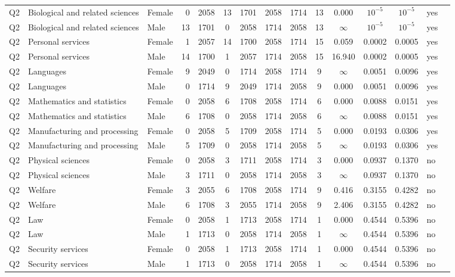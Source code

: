 \begin{longtable}{lllrcccccccccll}
Q2 & Biological and related sciences & Female & 0 & 2058 & 13 & 1701 & 2058 & 1714 & 13 & 0.000 & $10^{-5}$ & $10^{-5}$ & yes \\
Q2 & Biological and related sciences & Male & 13 & 1701 & 0 & 2058 & 1714 & 2058 & 13 & $\infty$ & $10^{-5}$ & $10^{-5}$ & yes \\
Q2 & Personal services & Female & 1 & 2057 & 14 & 1700 & 2058 & 1714 & 15 & 0.059 & 0.0002 & 0.0005 & yes \\
Q2 & Personal services & Male & 14 & 1700 & 1 & 2057 & 1714 & 2058 & 15 & 16.940 & 0.0002 & 0.0005 & yes \\
Q2 & Languages & Female & 9 & 2049 & 0 & 1714 & 2058 & 1714 & 9 & $\infty$ & 0.0051 & 0.0096 & yes \\
Q2 & Languages & Male & 0 & 1714 & 9 & 2049 & 1714 & 2058 & 9 & 0.000 & 0.0051 & 0.0096 & yes \\
Q2 & Mathematics and statistics & Female & 0 & 2058 & 6 & 1708 & 2058 & 1714 & 6 & 0.000 & 0.0088 & 0.0151 & yes \\
Q2 & Mathematics and statistics & Male & 6 & 1708 & 0 & 2058 & 1714 & 2058 & 6 & $\infty$ & 0.0088 & 0.0151 & yes \\
Q2 & Manufacturing and processing & Female & 0 & 2058 & 5 & 1709 & 2058 & 1714 & 5 & 0.000 & 0.0193 & 0.0306 & yes \\
Q2 & Manufacturing and processing & Male & 5 & 1709 & 0 & 2058 & 1714 & 2058 & 5 & $\infty$ & 0.0193 & 0.0306 & yes \\
Q2 & Physical sciences & Female & 0 & 2058 & 3 & 1711 & 2058 & 1714 & 3 & 0.000 & 0.0937 & 0.1370 & no \\
Q2 & Physical sciences & Male & 3 & 1711 & 0 & 2058 & 1714 & 2058 & 3 & $\infty$ & 0.0937 & 0.1370 & no \\
Q2 & Welfare & Female & 3 & 2055 & 6 & 1708 & 2058 & 1714 & 9 & 0.416 & 0.3155 & 0.4282 & no \\
Q2 & Welfare & Male & 6 & 1708 & 3 & 2055 & 1714 & 2058 & 9 & 2.406 & 0.3155 & 0.4282 & no \\
Q2 & Law & Female & 0 & 2058 & 1 & 1713 & 2058 & 1714 & 1 & 0.000 & 0.4544 & 0.5396 & no \\
Q2 & Law & Male & 1 & 1713 & 0 & 2058 & 1714 & 2058 & 1 & $\infty$ & 0.4544 & 0.5396 & no \\
Q2 & Security services & Female & 0 & 2058 & 1 & 1713 & 2058 & 1714 & 1 & 0.000 & 0.4544 & 0.5396 & no \\
Q2 & Security services & Male & 1 & 1713 & 0 & 2058 & 1714 & 2058 & 1 & $\infty$ & 0.4544 & 0.5396 & no \\

\end{longtable}
